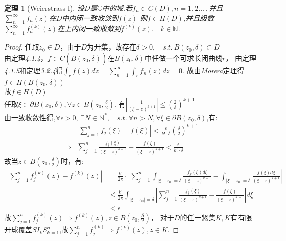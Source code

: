 \documentclass[b5paper,decoration]{qyxf-book}%
\newtheorem{mypro}{定理}[section]%
\begin{document}
\begin{mypro}[Weierstrass I]
    设$D$是$\mathbb{C}$中的域.若$f_n\in C(D),n=1,2\dots\ ,$并且$\displaystyle{\sum\limits_{n=1}^\infty f_n(z)}$在$D$中内闭一致收敛到$f(z)$
    则$f\in H(D)$,并且级数$\displaystyle{\sum\limits_{n=1}^\infty f_n^{(k)}(z)}$在上内闭一致收敛到$f^{(k)}(z).\quad k\in\mathbb{N}$.
\end{mypro}
\begin{proof}
    任取$z_0\in D$，由于$D$为开集，故存在$\delta>0,\quad s.t.\ \overline{B(z_0,\delta)}\subset D$\\
    由定理\emph{4.1.4}，$f\in C(\overline{B(z_0,\delta)})$在$B(z_0,\delta)$中任做一个可求长闭曲线$r$，
    由定理\emph{4.1.5}和定理\emph{3.2.4}得$\displaystyle{\int_rf(z)dz=\sum\limits_{n=1}^\infty\int_rf_n(z)dz=0}$.
    故由\emph{Morera}定理得$f\in H(B(z_0,\delta))$\\
    故$f\in H(D)$\\
    任取$\xi\in\partial B(z_0,\delta) ,\forall z\in B(z_0,\frac{\delta}{2})$.
    有$\displaystyle{\left|\frac{1}{(\xi-z)^{k+1}}\right|\leq(\frac{2}{\delta})^{k+1}}$\\
    由一致收敛性得,$\forall\epsilon>0,\ \exists N\in\mathbb{N}^*,\quad s.t.\ \forall n>N,\forall\xi\in\partial B(z_0,\delta)$,有:
    \begin{align*}
        &\left|\sum\limits_{j=1}^nf_j(\xi)-f(\xi)\right|
        <\frac{\epsilon}{k!\cdot\delta}(\frac{\delta}{2})^{k+1}\\
        \Rightarrow&\sum_{j=1}^n\frac{f_j(\xi)}{(\xi-z)^{k+1}}-\frac{f(\xi)}{(\xi-z)^{k+1}}<\frac{\epsilon}{k!\cdot\delta}
    \end{align*}
    故当$z\in B(z_0,\frac{\delta}{2})$时，有:
    \begin{align*}
        \left|\sum\limits_{j=1}^nf_j^{(k)}(z)-f^{(k)}(z)\right|
        &=\frac{k!}{2\pi}\cdot\left|\sum\limits_{j=1}^n\int_{|\xi-z_0|=\delta}\frac{f_j(\xi)d\xi}{(\xi-z)^{k+1}}
        -\int_{|\xi-z_0|=\delta}\frac{f(\xi)d\xi}{(\xi-z)^{k+1}}\right|\\
        &\leq\frac{k!}{2\pi}\int_{|\xi-z_0|=\delta}\left|\sum_{j=1}^n\frac{f_j(\xi)}{(\xi-z)^{k+1}}
        -\frac{f(\xi)}{(\xi-z)^{k+1}}\right|d\xi\\
        &<\epsilon
    \end{align*}
    故$\displaystyle{\sum_{j=1}^nf_j^{(k)}(z)\Rightarrow f^{(k)}(z),z\in B(z_0,\frac{\delta}{2})}$，
    对于$D$的任一紧集$K,K$有有限开球覆盖$SI_kS_{k=1}^n$,故$\displaystyle{\sum\limits_{j=1}^nf_j^{(k)}\Rightarrow f^{(k)}(z),z\in K}$.
\end{proof}
\end{document}
